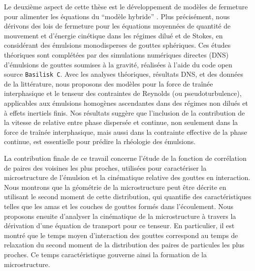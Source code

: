 Le deuxi\`eme aspect de cette th\`ese est le d\'eveloppement de mod\`eles de fermeture pour alimenter les \'equations du  ``mod\`ele hybride'' .
Plus pr\'ecis\'ement, nous d\'erivons des lois de fermeture pour les \'equations moyenn\'ees de quantit\'e de mouvement et d'\'energie cin\'etique dans les r\'egimes dilu\'e et de Stokes, en consid\'erant des \'emulsions monodisperses de gouttes sph\'eriques.
Ces \'etudes th\'eoriques sont compl\'et\'ees par des simulations num\'eriques directes (DNS) d'\'emulsions de gouttes soumises \`a la gravit\'e, r\'ealis\'ees \`a l'aide du code open source \texttt{Basilisk C}.
Avec les analyses th\'eoriques, r\'esultats DNS, et des donn\'ees de la litt\'erature, nous proposons des mod\`eles pour la force de traîn\'ee interphasique et le tenseur des contraintes de Reynolds (ou pseudoturbulence), applicables aux \'emulsions homog\`enes ascendantes dans des r\'egimes non dilu\'es et \`a effets inertiels finis.
Nos r\'esultats sugg\`ere que l'inclusion de la contribution de la vitesse de relative entre phase dispers\'ee et continue, non seulement dans la force de traîn\'ee interphasique, mais aussi dans la contrainte effective de la phase continue, est essentielle pour pr\'edire la rh\'eologie des \'emulsions.

La contribution finale de ce travail concerne l'\'etude de la fonction de corrélation de paires des voisines les plus proches, utilis\'ees pour caract\'eriser la microstructure de l'\'emulsion et la cin\'ematique relative des gouttes en interaction.
Nous montrons que la g\'eom\'etrie de la microstructure peut \^etre d\'ecrite en utilisant le second moment de cette distribution, qui quantifie des caract\'eristiques telles que les amas et les couches de gouttes form\'es dans l'\'ecoulement.
Nous proposons ensuite d'analyser la cin\'ematique de la microstructure \`a travers la d\'erivation d'une \'equation de transport pour ce tenseur.
En particulier, il est montr\'e que le temps moyen d'interaction des gouttes correspond au temps de relaxation du second moment de la distribution des paires de particules les plus proches.
Ce temps caract\'eristique gouverne ainsi la formation de la microstructure.
